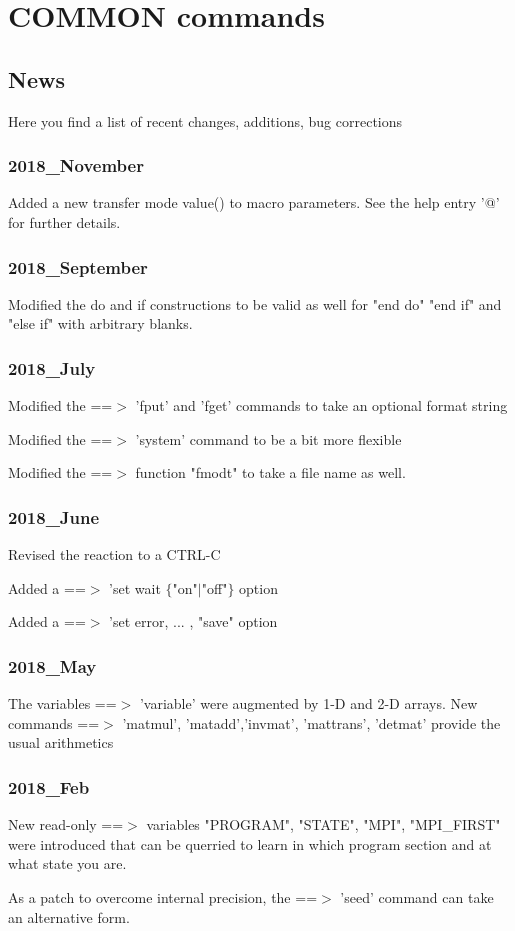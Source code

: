 \chapter{COMMON commands}
\section{News}
\par
Here you find a list of recent changes, additions, bug corrections 
\subsection*{2018\_November}
\par
Added a new transfer mode value() to macro parameters. See the 
help entry '@' for further details. 
\subsection*{2018\_September}
\par
Modified the do and if constructions to be valid as well for 
"end do" "end if" and "else if" with arbitrary blanks. 
\subsection*{2018\_July}
\par
Modified the ==$> $ 'fput' and 'fget' commands to take an optional 
    format string 
\par
Modified the ==$> $ 'system' command to be a bit more flexible 
\par
Modified the ==$> $ function "fmodt" to take a file name as well. 
\subsection*{2018\_June}
\par
Revised the reaction to a CTRL-C 
\par
Added a ==$> $ 'set wait $ \{$"on"$| $"off"$\} $ option 
\par
Added a ==$> $ 'set error, ... , "save" option 
\subsection*{2018\_May}
\par
The variables ==$> $ 'variable' were augmented by 1-D and 2-D arrays. 
New commands ==$> $ 'matmul', 'matadd','invmat', 'mattrans', 
'detmat' provide the usual arithmetics 
\subsection*{2018\_Feb}
\par
New read-only ==$> $ variables "PROGRAM", "STATE", "MPI", "MPI\_FIRST" 
were introduced that can be querried to learn in which program 
section and at what state you are. 
\par
As a patch to overcome internal precision, the ==$> $ 'seed' command 
can take an alternative form. 
